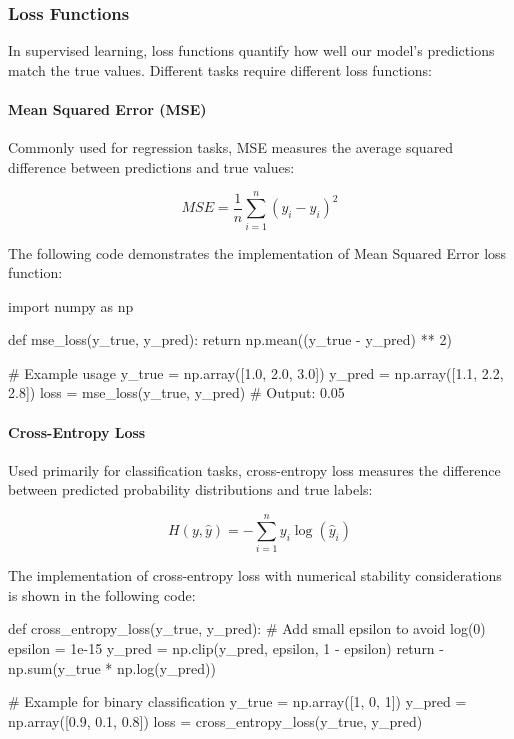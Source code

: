 \subsubsection{Loss Functions}
\noindent
In supervised learning, loss functions quantify how well our model's predictions match the true values. Different tasks require different loss functions:

\paragraph{Mean Squared Error (MSE)}
Commonly used for regression tasks, MSE measures the average squared difference between predictions and true values:

\[ MSE = \frac{1}{n}\sum_{i=1}^n (y_i - \hat{y}_i)^2 \]

The following code demonstrates the implementation of Mean Squared Error loss function:

\begin{pythoncode}
import numpy as np

def mse_loss(y_true, y_pred):
    return np.mean((y_true - y_pred) ** 2)

# Example usage
y_true = np.array([1.0, 2.0, 3.0])
y_pred = np.array([1.1, 2.2, 2.8])
loss = mse_loss(y_true, y_pred)  # Output: 0.05
\end{pythoncode}

\paragraph{Cross-Entropy Loss}
Used primarily for classification tasks, cross-entropy loss measures the difference between predicted probability distributions and true labels:

\[ H(y, \hat{y}) = -\sum_{i=1}^n y_i \log(\hat{y}_i) \]

The implementation of cross-entropy loss with numerical stability considerations is shown in the following code:

\begin{pythoncode}
def cross_entropy_loss(y_true, y_pred):
    # Add small epsilon to avoid log(0)
    epsilon = 1e-15
    y_pred = np.clip(y_pred, epsilon, 1 - epsilon)
    return -np.sum(y_true * np.log(y_pred))

# Example for binary classification
y_true = np.array([1, 0, 1])
y_pred = np.array([0.9, 0.1, 0.8])
loss = cross_entropy_loss(y_true, y_pred)
\end{pythoncode}

